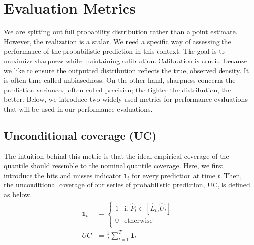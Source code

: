 \documentclass[11pt, letterpaper, journal]{IEEEtran}
\begin{document}
\section{Evaluation Metrics}
We are spitting out full probability distribution rather than a point estimate. However, the realization is a scalar. We need a specific way of assessing the performance of the probabilistic prediction in this context. The goal is to maximize sharpness while maintaining calibration. Calibration is crucial because we like to ensure the outputted distribution reflects the true, observed density. It is often time called unbiasedness. On the other hand, sharpness concerns the prediction variances, often called precision; the tighter the distribution, the better. Below, we introduce two widely used metrics for performance evaluations that will be used in our performance evaluations.

\subsection{Unconditional coverage (UC)}
The intuition behind this metric is that the ideal empirical coverage of the quantile should resemble to the nominal quantile coverage. Here, we first introduce the hits and misses indicator $\mathbf{1}_t$ for every prediction at time $t$. Then, the unconditional coverage of our series of probabilistic prediction, UC, is defined as below.
\begin{align*}
    \mathbf{1}_t &= \begin{cases}
        1 & \text{if $\hat{P}_t \in [\hat{L}_t, \hat{U}_t]$} \\
        0 & \text{otherwise} \\
    \end{cases} \\
    UC &= \frac{1}{T}\sum_{t=1}^T \mathbf{1}_t
\end{align*}
\end{document}
